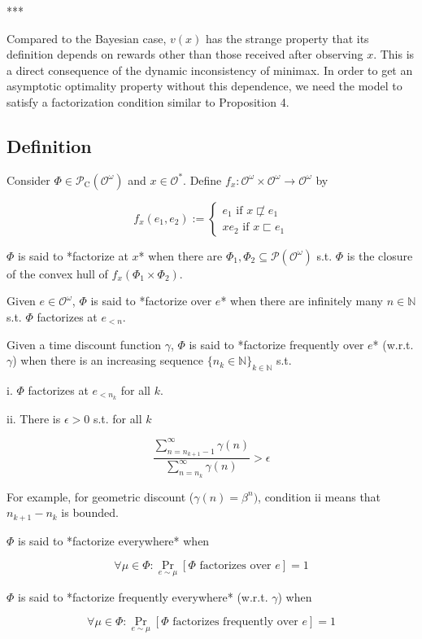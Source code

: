 \documentclass[a4paper]{article}
\DeclareMathOperator{\Prb}{Pr}
\newcommand{\Nats}{\mathbb{N}}
\newcommand{\Prob}{\mathcal{P}}
\newcommand{\Obs}{\mathcal{O}}
\newcommand{\ObsO}{\Obs^\omega}
\newcommand{\CC}{\mathcal{P}_{\operatorname{C}}}
\begin{document}
***

Compared to the Bayesian case, ${v(x)}$ has the strange property that its definition depends on rewards other than those received after observing ${x}$. This is a direct consequence of the dynamic inconsistency of minimax. In order to get an asymptotic optimality property without this dependence, we need the model to satisfy a factorization condition similar to Proposition 4.

\subsection{Definition}

Consider ${\Phi \in \CC(\ObsO)}$ and ${x \in \Obs^*}$. Define ${f_x: \ObsO \times \ObsO \rightarrow \ObsO}$ by

$${f_x(e_1,e_2):=\begin{cases}e_1 \text{ if } x \not\sqsubset e_1 \\xe_2 \text{ if } x \sqsubset e_1\end{cases}}$$

${\Phi}$ is said to *factorize at ${x}$* when there are ${\Phi_1, \Phi_2 \subseteq \Prob(\ObsO)}$ s.t. ${\Phi}$ is the closure of the convex hull of ${f_x(\Phi_1 \times \Phi_2)}$.

Given ${e \in \ObsO}$, ${\Phi}$ is said to *factorize over ${e}$* when there are infinitely many ${n \in \Nats}$ s.t. ${\Phi}$ factorizes at ${e_{<n}}$.

Given a time discount function ${\gamma}$, ${\Phi}$ is said to *factorize frequently over ${e}$* (w.r.t. ${\gamma}$) when there is an increasing sequence ${\{n_k \in \Nats\}_{k \in \Nats}}$ s.t.

i. ${\Phi}$ factorizes at ${e_{<n_k}}$ for all ${k}$.

ii. There is ${\epsilon > 0}$ s.t. for all ${k}$

$$\frac{\sum_{n = n_{k+1}-1}^\infty \gamma(n)}{\sum_{n = n_{k}}^\infty \gamma(n)} > \epsilon$$

For example, for geometric discount (${\gamma(n)=\beta^n)}$, condition ii means that ${n_{k+1}-n_k}$  is bounded.

${\Phi}$ is said to *factorize everywhere* when 

$${\forall \mu \in \Phi: \Prb_{e \sim \mu}[\Phi \text{ factorizes over } e] = 1}$$

${\Phi}$ is said to *factorize frequently everywhere* (w.r.t. ${\gamma}$) when

$${\forall \mu \in \Phi: \Prb_{e \sim \mu}[\Phi \text{ factorizes frequently over } e] = 1}$$
\end{document}
